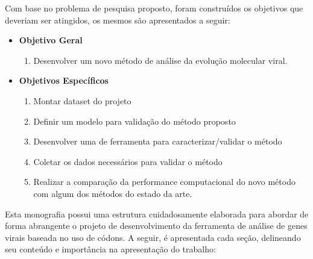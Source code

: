 Com base no problema de pesquisa proposto, foram construídos os objetivos que deveriam ser atingidos, os mesmos são apresentados a seguir:
\begin{itemize}
      \item \textbf{Objetivo Geral}
            \begin{enumerate}[label=~(\roman*)]
                  \item Desenvolver um novo método de análise da evolução molecular viral.
            \end{enumerate}
      \item \textbf{Objetivos Específicos}
            \begin{enumerate}[label=~(\roman*)]
                  \item Montar dataset do projeto
                  \item Definir um modelo para validação do método proposto
                  \item Desenvolver uma de ferramenta para caracterizar/validar o método
                  \item Coletar os dados necessários para validar o método
                  \item Realizar a comparação da performance computacional do novo método com algum dos métodos do estado da arte.
            \end{enumerate}
\end{itemize}

Esta monografia possui uma estrutura cuidadosamente elaborada para abordar de forma abrangente o projeto de desenvolvimento da ferramenta de análise de genes virais baseada no uso de códons. A seguir, é apresentada cada seção, delineando seu conteúdo e importância na apresentação do trabalho:

